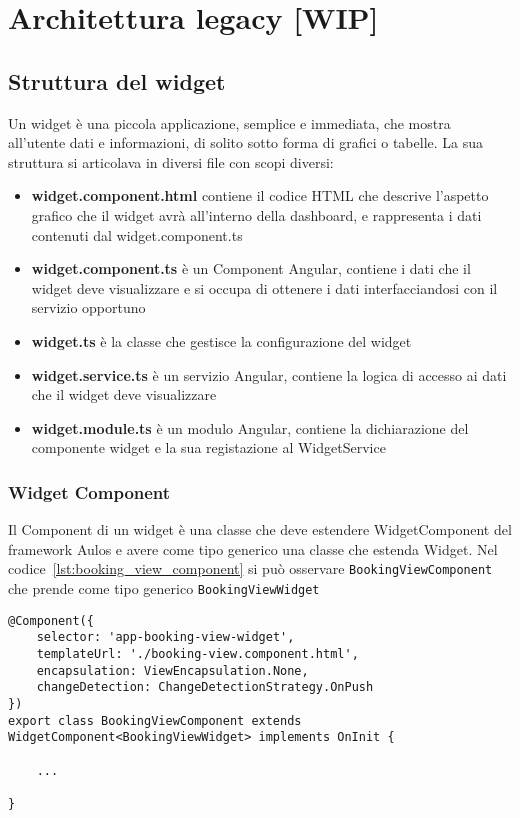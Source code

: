 \chapter{Architettura legacy [WIP]}
\section{Struttura del widget}
Un widget è una piccola applicazione, semplice e immediata, che mostra all'utente dati e informazioni, di solito sotto forma di grafici o tabelle.
La sua struttura si articolava in diversi file con scopi diversi:
\begin{itemize}
\item \textbf{widget.component.html} contiene il codice HTML che descrive l'aspetto grafico che il widget avrà all'interno della dashboard, e rappresenta i dati contenuti dal widget.component.ts
\item \textbf{widget.component.ts} è un Component Angular, contiene i dati che il widget deve visualizzare e si occupa di ottenere i dati interfacciandosi con il servizio opportuno
\item \textbf{widget.ts} è la classe che gestisce la configurazione del widget
\item \textbf{widget.service.ts} è un servizio Angular, contiene la logica di accesso ai dati che il widget deve visualizzare
\item \textbf{widget.module.ts} è un modulo Angular, contiene la dichiarazione del componente widget e la sua registazione al WidgetService
\end{itemize}


\subsection{Widget Component}
Il Component di un widget è una classe che deve estendere WidgetComponent del framework Aulos e avere come tipo generico una classe che estenda Widget. Nel codice~\ref{lst:booking_view_component} si può osservare \verb|BookingViewComponent| che prende come tipo generico \verb|BookingViewWidget|
\begin{lstlisting}[caption={orders.component.ts},label={lst:booking_view_component},style=javascriptCode]
@Component({
    selector: 'app-booking-view-widget',
    templateUrl: './booking-view.component.html',
    encapsulation: ViewEncapsulation.None,
    changeDetection: ChangeDetectionStrategy.OnPush
})
export class BookingViewComponent extends WidgetComponent<BookingViewWidget> implements OnInit {

	...

}
\end{lstlisting}
